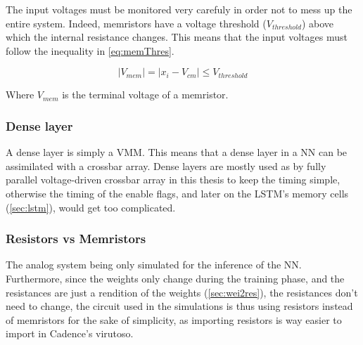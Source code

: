 The input voltages must be monitored very carefuly in order not to mess up the entire system. Indeed, memristors have a voltage threshold ($V_{threshold}$) above which the internal resistance changes. %
This means that the input voltages must follow the inequality in \cref{eq:memThres}.

\begin{equation}\label{eq:memThres}
  |V_{mem}|= |x_i-V_{cm}|\le V_{threshold}
\end{equation}

Where $V_{mem}$ is the terminal voltage of a memristor.

\subsubsection{Dense layer}

A dense layer is simply a \ac{VMM}. This means that a dense layer in a \ac{NN} can be assimilated with a crossbar array. Dense layers are mostly used as by fully parallel voltage-driven crossbar array in this thesis to keep the timing simple, otherwise the timing of the enable flags, and later on the \ac{LSTM}'s memory cells (\cref{sec:lstm}), would get too complicated.

\subsubsection{Resistors vs Memristors}

The analog system being only simulated for the inference of the \ac{NN}. Furthermore, since the weights only change during the training phase, and the resistances are just a rendition of the weights (\cref{sec:wei2res}), the resistances don't need to change, the circuit used in the simulations is thus using resistors instead of memristors for the sake of simplicity, as importing resistors is way easier to import in Cadence's virutoso.
